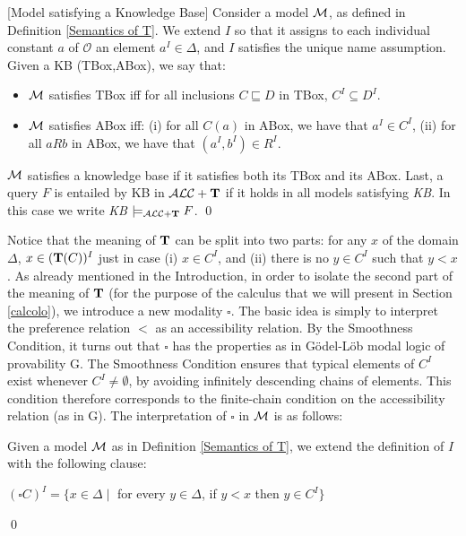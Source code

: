 \documentclass[a4paper, 11pt, oneside]{duthesis}
\newcommand{\tip}{{\bf T}}
\newcommand{\alct}{\mathcal{ALC}+\tip}
\newcommand{\vuoto} {\emptyset}
\newcommand{\tc} {\mid}
\newcommand{\appartiene} {\in}
\newcommand{\bbox}{\square}
\newcommand{\diverso} {\neq}
\newcommand{\emme} {\begin{mathcal}M\end{mathcal}}
\newenvironment{definition}
{\begin{defi} \rm}{\qed \end{defi}}
\newenvironment{definition}
{\begin{defi} \rm}{\qed \end{defi}}
\newtheorem{definition}{Definition}
\newcounter{posu}
\newtheorem{definition}[posu]{Definition}
\begin{document}
\begin{definition}[Model satisfying a Knowledge Base]\label{Def-ModelSatTBox-ABox} Consider a model $\emme$, as defined in Definition \ref{Semantics of T}.
We extend $I$ so that it assigns to each individual constant $a$ of $\mathcal{O}$ an element $a^I \in \Delta$,  and $I$ satisfies the unique name assumption. Given a KB (TBox,ABox), we say that:

\begin{itemize}
\item $\emme$  satisfies TBox iff  for all  inclusions $C \sqsubseteq D$  in TBox, $C^I \subseteq D^I$.
\item $\emme$ satisfies ABox  iff:
(i) for all $C(a)$  in ABox, we have that $a^I \in C^I$,
(ii) for all $aRb$ in ABox, we have that $(a^I,b^I) \in R^I$.
\end{itemize}

\noindent $\emme$ satisfies a knowledge base if it satisfies both its TBox and its ABox.
Last, a query $F$  is  entailed by KB in $\alct$ if it holds in all models satisfying \emph{KB}.
In this case we write \emph{KB} $\models_{\alct} F$.
\end{definition}


\noindent Notice that the meaning of $\tip$ can be split into two parts: for any $x$ of the domain $\Delta$,  $x \in (\tip(C))^I$ just in case (i) $x \in C^I$, and (ii) there is no $y \in C^I$ such that $y < x$.
As already mentioned in the Introduction, in order to isolate the second part of the meaning of $\tip$ (for the purpose of the calculus that we will present in Section \ref{calcolo}), we introduce a new modality $\bbox$.
The basic idea is simply to interpret the preference relation $<$ as an accessibility relation.
By the Smoothness Condition, it turns out that $\bbox$ has the properties as in G\"odel-L\"ob modal logic of provability G.
The Smoothness Condition ensures that typical elements of $C^I$ exist whenever $C^I \diverso \vuoto$, by avoiding infinitely descending chains of elements.
This condition therefore corresponds to the finite-chain condition on the accessibility relation (as in G).
The interpretation of $\bbox$ in $\emme$ is as follows:

\begin{definition}\label{def-box}
Given a model $\emme$ as in Definition \ref{Semantics of T}, we extend the definition of $I$ with the following clause:
\begin{center}
	$(\bbox C)^I = \{x \in \Delta \tc $  for every $y \appartiene \Delta$, if $y < x$ then $y \in C^I \}$
\end{center}
\end{definition}
\end{document}
